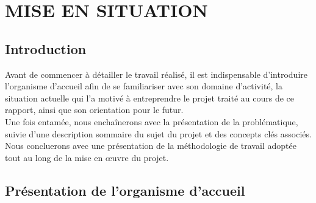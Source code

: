 
\setcounter{mtc}{3} %
\chapter{MISE EN SITUATION}
\minitoc  %

\graphicspath{{Chapitre1/figures/}}
\pagestyle{fancy}
\fancyhf{}
\fancyhead[R]{\bfseries\rightmark}
\fancyfoot[R]{\thepage}
\renewcommand{\headrulewidth}{0.5pt}
\renewcommand{\footrulewidth}{0pt}
\renewcommand{\chaptermark}[1]{\markboth{\MakeUppercase{\chaptername~\thechapter. #1 }}{}}
\renewcommand{\sectionmark}[1]{\markright{\thechapter.\thesection~ #1}}

\begin{spacing}{1.5}

\section*{Introduction}
Avant de commencer à détailler le travail réalisé, il est indispensable d'introduire l'organisme d'accueil afin de se familiariser avec son domaine d'activité, la situation actuelle qui l'a motivé à entreprendre le projet traité au cours de ce rapport, ainsi que son orientation pour le futur.\\
Une fois entamée, nous enchaînerons avec la présentation de la problématique, suivie d'une description sommaire du sujet du projet et des concepts clés associés. Nous concluerons avec une présentation de la méthodologie de travail adoptée tout au long de la mise en œuvre du projet.


\section{Présentation de l'organisme d'accueil}


\end{spacing}
